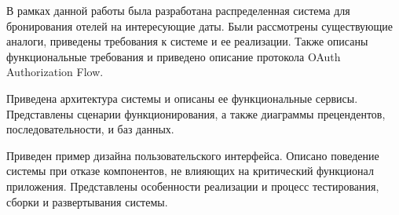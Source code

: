 {}
В рамках данной работы была разработана распределенная система для бронирования отелей на интересующие даты. Были рассмотрены существующие аналоги, приведены требования к системе и ее реализации. Также описаны функциональные требования и приведено описание протокола OAuth Authorization Flow. 

Приведена архитектура системы и описаны ее функциональные сервисы. Представлены сценарии функционирования, а также диаграммы прецендентов, последовательности, и баз данных.

Приведен пример дизайна пользовательского интерфейса. Описано поведение системы при отказе компонентов, не влияющих на критический функционал приложения. Представлены особенности реализации и процесс тестирования, сборки и развертывания системы.
